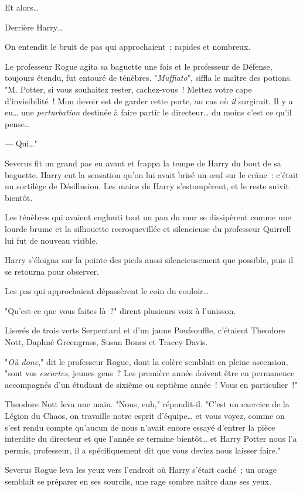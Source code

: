 Et alors…

Derrière Harry…

On entendit le bruit de pas qui approchaient~; rapides et nombreux.

Le professeur Rogue agita sa baguette une fois et le professeur de Défense, toujours étendu, fut entouré de ténèbres. "\emph{Muffiato}", siffla le maître des potions. "M. Potter, si vous souhaitez rester, cachez-vous~! Mettez votre cape d'invisibilité~! Mon devoir est de garder cette porte, au cas où \emph{il} surgirait. Il y a eu… une \emph{perturbation} destinée à faire partir le directeur… du moins c'est ce qu'il pense…

--- Qui…"

Severus fit un grand pas en avant et frappa la tempe de Harry du bout de sa baguette. Harry eut la sensation qu'on lui avait brisé un œuf sur le crâne~: c'était un sortilège de Désillusion. Les mains de Harry s'estompèrent, et le reste suivit bientôt.

Les ténèbres qui avaient englouti tout un pan du mur se dissipèrent comme une lourde brume et la silhouette recroquevillée et silencieuse du professeur Quirrell lui fut de nouveau visible.

Harry s'éloigna sur la pointe des pieds aussi silencieusement que possible, puis il se retourna pour observer.

Les pas qui approchaient dépassèrent le coin du couloir…

"Qu'est-ce que vous faites là~?" dirent plusieurs voix à l'unisson.

Liserés de trois verts Serpentard et d'un jaune Poufsouffle, c'étaient Theodore Nott, Daphné Greengrass, Susan Bones et Tracey Davis.

"\emph{Où donc}," dit le professeur Rogue, dont la colère semblait en pleine ascension, "sont vos \emph{escortes}, jeunes gens~? Les première année doivent être en permanence accompagnés d'un étudiant de sixième ou septième année~! Vous en particulier~!"

Theodore Nott leva une main. "Nous, euh," répondit-il. "C'est un exercice de la Légion du Chaos, on travaille notre esprit d'équipe… et vous voyez, comme on s'est rendu compte qu'aucun de nous n'avait encore essayé d'entrer la pièce interdite du directeur et que l'année se termine bientôt… et Harry Potter nous l'a permis, professeur, il a spécifiquement dit que vous deviez nous laisser faire."

Severus Rogue leva les yeux vers l'endroit où Harry s'était caché~; un orage semblait se préparer en ses sourcils, une rage sombre naître dans ses yeux.

